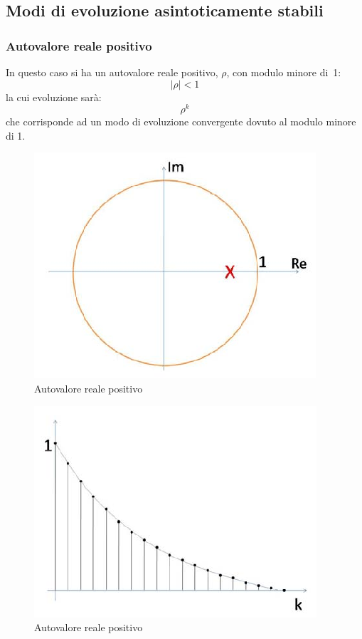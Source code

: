\documentclass[a4paper]{report}
\begin{document}
\subsection{Modi di evoluzione asintoticamente stabili}
\subsubsection{Autovalore reale positivo}
In questo caso si ha un autovalore reale positivo, $\rho$, con
modulo minore di~1:
\[
|\rho| < 1
\]
la cui evoluzione sar\`a:
\[
\rho^k
\]
che corrisponde ad un modo di evoluzione convergente dovuto al
modulo minore di 1.

\begin{figure}[!h]
  \begin{center}
    \includegraphics[scale=0.4]{./figures/autovaloreRealePositivo00.png}
    \caption{Autovalore reale positivo}\label{fig:autovaloreRealePositivo00}
  \end{center}
\end{figure}

\begin{figure}[!h]
  \begin{center}
    \includegraphics[scale=0.4]{./figures/autovaloreRealePositivo01.png}
    \caption{Autovalore reale positivo}\label{fig:autovaloreRealePositivo01}
  \end{center}
\end{figure}
\end{document}
